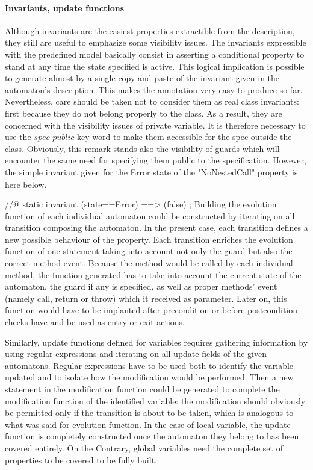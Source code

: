 \paragraph{Invariants, update functions}
Although invariants are the easiest properties extractible from the description, they still are useful to emphasize some visibility issues. The invariants expressible with the predefined model basically consist in asserting a conditional property to stand at any time the state specified is active. This logical implication is possible to generate almost by a single copy and paste of the invariant given in the automaton's description. This makes the annotation very easy to produce so-far. Nevertheless, care should be taken not to consider them as real class invariants: first because they do not belong properly to the class. As a result, they are concerned with the visibility issues of private variable. It is therefore necessary to use the $spec\_public$ key word to make them accessible for the spec outside the class. Obviously, this remark stands also the visibility of guards which will encounter the same need for specifying them public to the specification. However, the simple invariant given for the Error state of the "NoNestedCall" property is here below. 

//@ static invariant (state==Error) ==> (false) ;
Building the evolution function of each individual automaton could be constructed by iterating on all transition composing the automaton. In the present case, each transition defines a new possible behaviour of the property. Each transition enriches the evolution function of one statement taking into account not only the guard but also the correct method event. Because the method would be called by each individual method, the function generated has to take into account the current state of the automaton, the guard if any is specified, as well as proper methods' event (namely call, return or throw) which it received as parameter. Later on, this function would have to be implanted after precondition or before postcondition checks have and be used as entry or exit actions. 

Similarly, update functions defined for variables requires gathering information by using regular expressions and iterating on all update fields of the given automatons. Regular expressions have to be used both to identify the variable updated and to isolate how the modification would be performed. Then a new statement in the modification function could be generated to complete the modification function of the identified variable: the modification should obviously be permitted only if the transition is about to be taken, which is analogous to what was said for evolution function. In the case of local variable, the update function is completely constructed once the automaton they belong to has been covered entirely. On the Contrary, global variables need the complete set of properties to be covered to be fully built.

